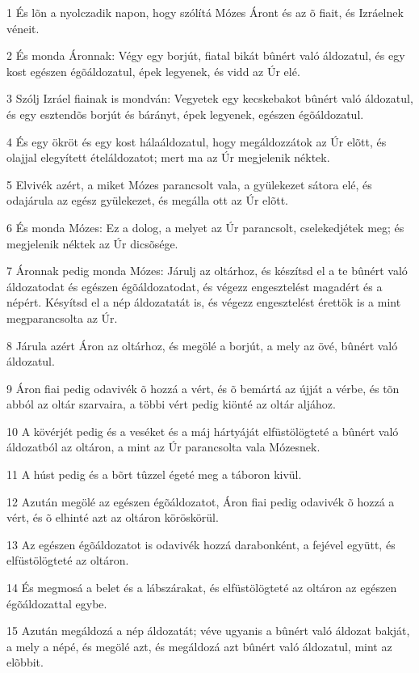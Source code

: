 \par 1 És lõn a nyolczadik napon, hogy szólítá Mózes Áront és az õ fiait, és Izráelnek véneit.
\par 2 És monda Áronnak: Végy egy borjút, fiatal bikát bûnért való áldozatul, és egy kost egészen égõáldozatul, épek legyenek, és vidd az Úr elé.
\par 3 Szólj Izráel fiainak is mondván: Vegyetek egy kecskebakot bûnért való áldozatul, és egy esztendõs borjút és bárányt, épek legyenek, egészen égõáldozatul.
\par 4 És egy ökröt és egy kost hálaáldozatul, hogy megáldozzátok az Úr elõtt, és olajjal elegyített ételáldozatot; mert ma az Úr megjelenik néktek.
\par 5 Elvivék azért, a miket Mózes parancsolt vala, a gyülekezet sátora elé, és odajárula az egész gyülekezet, és megálla ott az Úr elõtt.
\par 6 És monda Mózes: Ez a dolog, a melyet az Úr parancsolt, cselekedjétek meg; és megjelenik néktek az Úr dicsõsége.
\par 7 Áronnak pedig monda Mózes: Járulj az oltárhoz, és készítsd el a te bûnért való áldozatodat és egészen égõáldozatodat, és végezz engesztelést magadért és a népért. Késyítsd el a nép áldozatatát is, és végezz engesztelést érettök is a mint megparancsolta az Úr.
\par 8 Járula azért Áron az oltárhoz, és megölé a borjút, a mely az övé, bûnért való áldozatul.
\par 9 Áron fiai pedig odavivék õ hozzá a vért, és õ bemártá az újját a vérbe, és tõn abból az oltár szarvaira, a többi vért pedig kiönté az oltár aljához.
\par 10 A kövérjét pedig és a veséket és a máj hártyáját elfüstölögteté a bûnért való áldozatból az oltáron, a mint az Úr parancsolta vala Mózesnek.
\par 11 A húst pedig és a bõrt tûzzel égeté meg a táboron kivül.
\par 12 Azután megölé az egészen égõáldozatot, Áron fiai pedig odavivék õ hozzá a vért, és õ elhinté azt az oltáron köröskörül.
\par 13 Az egészen égõáldozatot is odavivék hozzá darabonként, a fejével együtt, és elfüstölögteté az oltáron.
\par 14 És megmosá a belet és a lábszárakat, és elfüstölögteté az oltáron az egészen égõáldozattal egybe.
\par 15 Azután megáldozá a nép áldozatát; véve ugyanis a bûnért való áldozat bakját, a mely a népé, és megölé azt, és megáldozá azt bûnért való áldozatul, mint az elõbbit.
